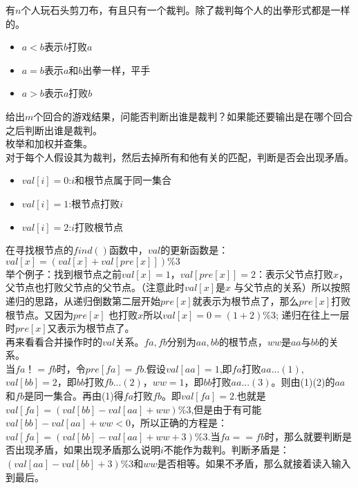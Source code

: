 有$n$个人玩石头剪刀布，有且只有一个裁判。除了裁判每个人的出拳形式都是一样的。
\begin{itemize}
\item $a<b$表示$b$打败$a$
\item $a=b$表示$a$和$b$出拳一样，平手
\item $a>b$表示$a$打败$b$
\end{itemize}
给出$m$个回合的游戏结果，问能否判断出谁是裁判？如果能还要输出是在哪个回合之后判断出谁是裁判。\\

枚举和加权并查集。\\
对于每个人假设其为裁判，然后去掉所有和他有关的匹配，判断是否会出现矛盾。
\begin{itemize}
\item $val[i]=0$:$i$和根节点属于同一集合
\item $val[i]=1$:根节点打败$i$
\item $val[i]=2$:$i$打败根节点
\end{itemize}
在寻找根节点的$find()$函数中，$val$的更新函数是：$val[x]=(val[x]+val[pre[x]])\%3 $ \\
举个例子：找到根节点之前$val[x]=1$，$val[pre[x]]=2$：表示父节点打败$x$，父节点也打败父节点的父节点。（注意此时$val[x]$是$x$ 与父节点的关系）所以按照递归的思路，从递归倒数第二层开始$pre[x]$就表示为根节点了，那么$pre[x]$打败根节点。又因为$pre[x]$ 也打败$x$所以$val[x]=0=(1+2)\%3$; 递归在往上一层时$pre[x]$又表示为根节点了。 \\
再来看看合并操作时的$val$关系。$fa,fb$分别为$aa,bb$的根节点，$ww$是$aa$与$bb$的关系。 \\
当$fa！=fb$时，令$pre[fa]=fb$.假设$val[aa]=1$,即$fa$打败$aa...(1)$,$val[bb]=2$，即$bb$打败$fb...(2)$，$ww=1$，即$bb$打败$aa...(3)$。则由(1)(2)的$aa$和$fb$是同一集合。再由(1)得$fa$打败$fb$。即$val[fa]=2$.也就是$val[fa]=(val[bb]-val[aa]+ww)\%3$,但是由于有可能$val[bb]-val[aa]+ww<0$，所以正确的方程是：$val[fa]=(val[bb]-val[aa]+ww+3)\%3$.当$fa==fb$时，那么就要判断是否出现矛盾，如果出现矛盾那么说明$i$不能作为裁判。判断矛盾是：$(val[aa]-val[bb]+3)\%3$和$ww$是否相等。如果不矛盾，那么就接着读入输入到最后。

